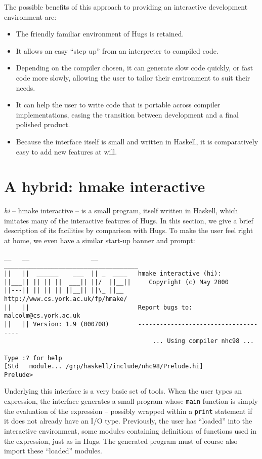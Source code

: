 \documentclass[a4paper]{llncs}
\begin{document}
The possible benefits of this approach to providing an interactive
development environment are:

\begin{itemize}
\item
  The friendly familiar environment of Hugs is retained.
\item
  It allows an easy ``step up'' from an interpreter to compiled code.
\item
  Depending on the compiler chosen, it can generate slow code quickly,
  or fast code more slowly, allowing the user to tailor their environment
  to suit their needs.
\item
  It can help the user to write code that is portable across compiler
  implementations, easing the transition between development and a
  final polished product.
\item
  Because the interface itself is small and written in Haskell, it is
  comparatively easy to add new features at will.
\end{itemize}




\section{A hybrid: hmake interactive}

{\em hi} -- hmake interactive -- is a small program, itself written
in Haskell, which imitates many of the interactive features of Hugs.
In this section, we give a brief description of its facilities by
comparison with Hugs.  To make the user feel right at home, we even
have a similar start-up banner and prompt:

{\small
\begin{verbatim}
__   __                 __           _____________________________________
||   ||  ______    ___  || _  ____   hmake interactive (hi):
||___|| || || ||  ___|| ||/  ||__||     Copyright (c) May 2000
||---|| || || || ||__|| ||\_ ||__    http://www.cs.york.ac.uk/fp/hmake/
||   ||                              Report bugs to: malcolm@cs.york.ac.uk
||   || Version: 1.9 (000708)        -------------------------------------
                                         ... Using compiler nhc98 ...

Type :? for help
[Std   module... /grp/haskell/include/nhc98/Prelude.hi]
Prelude> 
\end{verbatim}
}

Underlying this interface is a very basic set of tools.  When the
user types an expression, the interface generates a small program
whose {\tt main} function is simply the evaluation of the expression
-- possibly wrapped within a {\tt print} statement if it does not
already have an I/O type.  Previously, the user has ``loaded'' into
the interactive environment, some modules containing definitions of
functions used in the expression, just as in Hugs.  The generated
program must of course also import these ``loaded'' modules.
\end{document}
